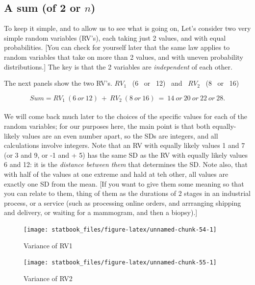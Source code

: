\documentclass[]{book}
\begin{document}
\hypertarget{a-sum-of-2-or-n}{%
\subsection{\texorpdfstring{A sum (of 2 or \(n\))}{A sum (of 2 or n)}}\label{a-sum-of-2-or-n}}

To keep it simple, and to allow us to see what is going on, Let's consider two very simple random variables (RV's), each taking just 2 values, and with equal probabilities. {[}You can check for yourself later that the same law applies to random variables that take on more than 2 values, and with uneven probability distributions.{]} The key is that the 2 variables are \emph{independent} of each other.

The next panels show the two RV's. \(RV_1\) ~(6 ~or ~12) ~and ~\(RV_2\) ~(8 ~or ~16)

\[Sum = RV_1 \ (6 \ or \ 12) \ + \ RV_2 \ (8 \ or \ 16) \ = \ 14 \ or \ 20 \ or \ 22 \ or \ 28.\]\\
We will come back much later to the choices of the specific values for each of the random variables; for our purposes here, the main point is that both equally-likely values are an even number apart, so the SDs are integers, and all calculations involve integers. Note that an RV with equally likely values 1 and 7 (or 3 and 9, or -1 and + 5) has the same SD as the RV with equally likely values 6 and 12: it is the \emph{distance between them} that determines the SD. Note also, that with half of the values at one extreme and hald at teh other, all values are exactly one SD from the mean. {[}If you want to give them some meaning so that you can relate to them, thing of them as the durations of 2 stages in an industrial process, or a service (such as processing online orders, and arrranging shipping and delivery, or waiting for a mammogram, and then a biopsy).{]}

\begin{figure}

{\centering \texttt{[image: statbook\_files/figure-latex/unnamed-chunk-54-1]} 

}

\caption{Variance of RV1}\label{fig:unnamed-chunk-54}
\end{figure}

\begin{figure}

{\centering \texttt{[image: statbook\_files/figure-latex/unnamed-chunk-55-1]} 

}

\caption{Variance of RV2}\label{fig:unnamed-chunk-55}
\end{figure}
\end{document}
